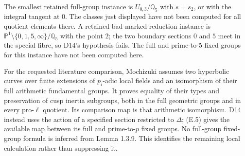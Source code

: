 The smallest retained full-group instance is $U_{0,3}/\mathbb Q_5$
with $s=s_2$, or with the integral tangent at $0$.  The classes just
displayed have not been computed for all quotient elements there.
A retained bad-marked-reduction instance is
$\mathbb P^1\setminus\{0,1,5,\infty\}/\mathbb Q_5$ with the point $2$;
the two boundary sections $0$ and $5$ meet in the special fibre, so
D14's hypothesis fails.  The full and prime-to-$5$ fixed groups for
this instance have not been computed here.

For the requested literature comparison, Mochizuki
\cite[Lemma 1.3.9]{D_Mochizuki2004} assumes two hyperbolic curves over
finite extensions of $p_i$-adic local fields and an isomorphism of
their full arithmetic fundamental groups.  It proves equality of
their types and preservation of cusp inertia subgroups, both in the
full geometric groups and in every pro-$\ell$ quotient.  Its comparison
map is that arithmetic isomorphism.  D14 instead uses the action of a
specified section restricted to $\Delta$; (E.5) gives the available
map between its full and prime-to-$p$ fixed groups.  No full-group
fixed-group formula is inferred from Lemma 1.3.9.  This identifies the
remaining local calculation rather than suppressing it.
